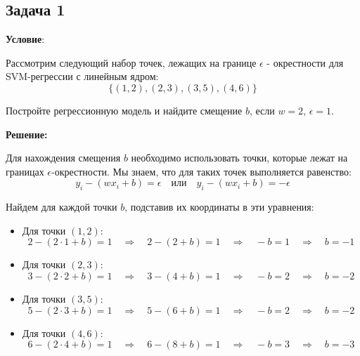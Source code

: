 \subsection{Задача 1}
\textbf{Условие}:
\par Рассмотрим следующий набор точек, лежащих на границе \(\epsilon\) - окрестности для SVM-регрессии с линейным ядром:
\begin{equation*}
    \{(1, 2), (2, 3), (3, 5), (4, 6)\}
\end{equation*}
\par Постройте регрессионную модель и найдите смещение \(b\), если \(w = 2\), \(\epsilon = 1\).
\par \noindent \textbf{Решение:}
\par Для нахождения смещения \(b\) необходимо использовать точки, которые лежат на границах \(\epsilon\)-окрестности. Мы знаем, что для таких точек выполняется равенство:
\begin{equation*}
    y_i - (w x_i + b) = \epsilon \quad \text{или} \quad y_i - (w x_i + b) = -\epsilon
\end{equation*}
\par Найдем для каждой точки \(b\), подставив их координаты в эти уравнения:
\begin{itemize}
    \item Для точки \((1, 2)\):
          \begin{equation*}
              2 - (2 \cdot 1 + b) = 1 \quad \Rightarrow \quad 2 - (2 + b) = 1 \quad \Rightarrow \quad -b = 1 \quad \Rightarrow \quad b = -1
          \end{equation*}
    \item Для точки \((2, 3)\):
          \begin{equation*}
              3 - (2 \cdot 2 + b) = 1 \quad \Rightarrow \quad 3 - (4 + b) = 1 \quad \Rightarrow \quad -b = 2 \quad \Rightarrow \quad b = -2
          \end{equation*}
    \item Для точки \((3, 5)\):
          \begin{equation*}
              5 - (2 \cdot 3 + b) = 1 \quad \Rightarrow \quad 5 - (6 + b) = 1 \quad \Rightarrow \quad -b = 2 \quad \Rightarrow \quad b = -2
          \end{equation*}
    \item Для точки \((4, 6)\):
          \begin{equation*}
              6 - (2 \cdot 4 + b) = 1 \quad \Rightarrow \quad 6 - (8 + b) = 1 \quad \Rightarrow \quad -b = 3 \quad \Rightarrow \quad b = -3
          \end{equation*}
\end{itemize}
